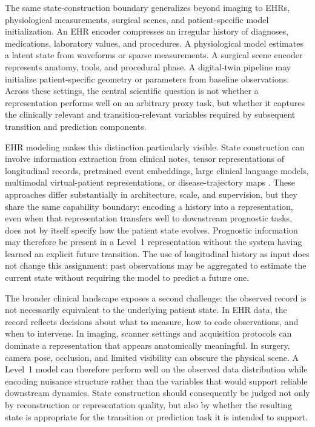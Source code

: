 The same state-construction boundary generalizes beyond imaging to EHRs, physiological measurements, surgical scenes, and patient-specific model initialization. An EHR encoder compresses an irregular history of diagnoses, medications, laboratory values, and procedures. A physiological model estimates a latent state from waveforms or sparse measurements. A surgical scene encoder represents anatomy, tools, and procedural phase. A digital-twin pipeline may initialize patient-specific geometry or parameters from baseline observations. Across these settings, the central scientific question is not whether a representation performs well on an arbitrary proxy task, but whether it captures the clinically relevant and transition-relevant variables required by subsequent transition and prediction components.

EHR modeling makes this distinction particularly visible. State construction can involve information extraction from clinical notes, tensor representations of longitudinal records, pretrained event embeddings, large clinical language models, multimodal virtual-patient representations, or disease-trajectory maps \citep{ying2025genie,de2018deep,rasmy2021med,yang2022gatortron,zhang2026multimodal,schulam2016disease}. These approaches differ substantially in architecture, scale, and supervision, but they share the same capability boundary: encoding a history into a representation, even when that representation transfers well to downstream prognostic tasks, does not by itself specify how the patient state evolves. Prognostic information may therefore be present in a Level~1 representation without the system having learned an explicit future transition. The use of longitudinal history as input does not change this assignment: past observations may be aggregated to estimate the current state without requiring the model to predict a future one.

The broader clinical landscape exposes a second challenge: the observed record is not necessarily equivalent to the underlying patient state. In EHR data, the record reflects decisions about what to measure, how to code observations, and when to intervene. In imaging, scanner settings and acquisition protocols can dominate a representation that appears anatomically meaningful. In surgery, camera pose, occlusion, and limited visibility can obscure the physical scene. A Level~1 model can therefore perform well on the observed data distribution while encoding nuisance structure rather than the variables that would support reliable downstream dynamics. State construction should consequently be judged not only by reconstruction or representation quality, but also by whether the resulting state is appropriate for the transition or prediction task it is intended to support.

